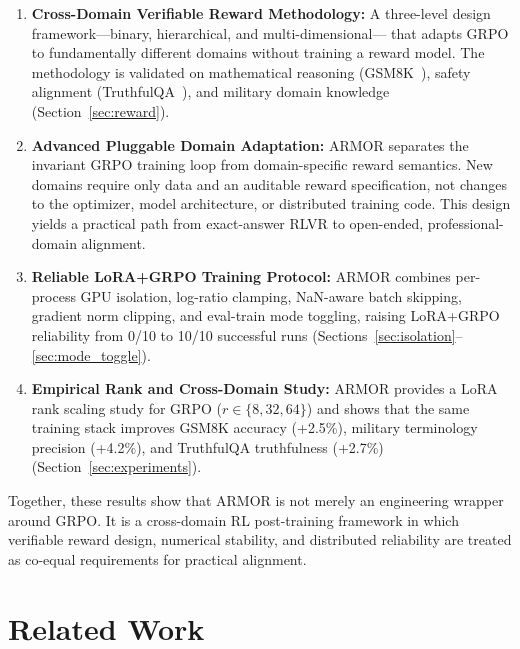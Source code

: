 \documentclass{ieeeaccess}
\begin{document}
\begin{enumerate}
\item \textbf{Cross-Domain Verifiable Reward Methodology:}
A three-level design framework---binary, hierarchical, and multi-dimensional---
that adapts GRPO to fundamentally different domains without training a reward
model.  The methodology is validated on mathematical reasoning
(GSM8K~\cite{cobbe2021gsm8k}), safety alignment
(TruthfulQA~\cite{lin2022truthfulqa}), and military domain knowledge
(Section~\ref{sec:reward}).

\item \textbf{Advanced Pluggable Domain Adaptation:}
ARMOR separates the invariant GRPO training loop from domain-specific reward
semantics.  New domains require only data and an auditable reward specification,
not changes to the optimizer, model architecture, or distributed training code.
This design yields a practical path from exact-answer RLVR to open-ended,
professional-domain alignment.

\item \textbf{Reliable LoRA+GRPO Training Protocol:}
ARMOR combines per-process GPU isolation, log-ratio clamping, NaN-aware batch
skipping, gradient norm clipping, and eval-train mode toggling, raising
LoRA+GRPO reliability from 0/10 to 10/10 successful runs
(Sections~\ref{sec:isolation}--\ref{sec:mode_toggle}).

\item \textbf{Empirical Rank and Cross-Domain Study:}
ARMOR provides a LoRA rank scaling study for GRPO ($r\in\{8,32,64\}$) and
shows that the same training stack improves GSM8K accuracy (+2.5\%), military
terminology precision (+4.2\%), and TruthfulQA truthfulness (+2.7\%)
(Section~\ref{sec:experiments}).
\end{enumerate}

Together, these results show that ARMOR is not merely an engineering wrapper
around GRPO.  It is a cross-domain RL post-training framework in which
verifiable reward design, numerical stability, and distributed reliability are
treated as co-equal requirements for practical alignment.

\section{Related Work}
\label{sec:related}
\end{document}
